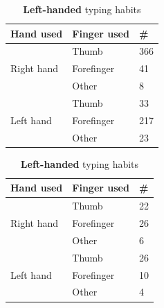 {{    %
    \begin{table}[H]
      \parbox{.5\linewidth}{
        \centering
        \begin{tabular}{ l | l | l }
          \hline
          {\bf Hand used} & {\bf Finger used} & {\bf \#} \\ \hline
          \multirow{3}{*}{Right hand} & Thumb & 366 \\
          & Forefinger & 41 \\
          & Other & 8 \\ \hline
          \multirow{3}{*}{Left hand} & Thumb & 33 \\
          & Forefinger & 217 \\
          & Other & 23 \\ \hline
        \end{tabular}
        \caption{{\bf Right-handed} typing habits}
        \label{tab:righthandfinger}
      }
      \hfill
      \parbox{.5\linewidth}{
        \centering
        \begin{tabular}{ l | l | l }
          \hline
          {\bf Hand used} & {\bf Finger used} & {\bf \#} \\ \hline
          \multirow{3}{*}{Right hand} & Thumb & 22 \\ 
          & Forefinger & 26 \\
          & Other & 6 \\ \hline
          \multirow{3}{*}{Left hand} & Thumb & 26 \\ 
          & Forefinger & 10 \\
          & Other & 4 \\ \hline
        \end{tabular}
        \caption{{\bf Left-handed} typing habits}
        \label{tab:lefthandfinger}
      }
    \end{table}

}}
